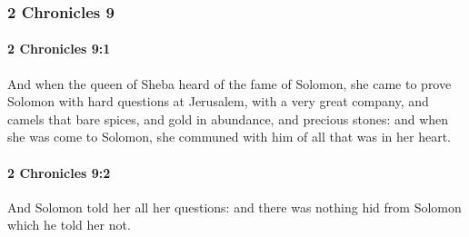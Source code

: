 	\subsubsection{2 Chronicles 9} %
		\label{2CHRONICLES-9}

		\paragraph{2 Chronicles 9:1} %
			\label{2CHRONICLES-9-1}

			And when the queen of Sheba heard of the fame of Solomon, she came to prove Solomon with hard questions at Jerusalem, with a very great company, and camels that bare spices, and gold in abundance, and precious stones: and when she was come to Solomon, she communed with him of all that was in her heart.


		\paragraph{2 Chronicles 9:2} %
			\label{2CHRONICLES-9-2}

			And Solomon told her all her questions: and there was nothing hid from Solomon which he told her not.

